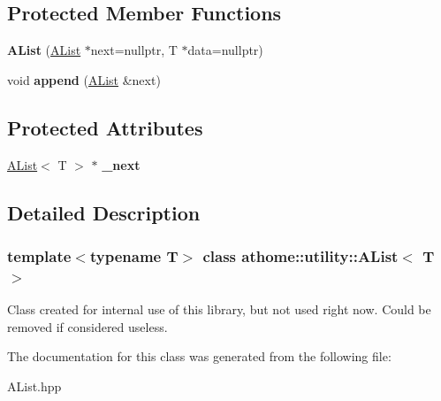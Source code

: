 \subsection*{Protected Member Functions}
\begin{DoxyCompactItemize}
\item 
\mbox{\label{classathome_1_1utility_1_1_a_list_a98364a62d1b0d749b5424ae79664a3b5}} 
{\bfseries A\+List} (\mbox{\hyperlink{classathome_1_1utility_1_1_a_list}{A\+List}} $\ast$next=nullptr, T $\ast$data=nullptr)
\item 
\mbox{\label{classathome_1_1utility_1_1_a_list_ac6e76d2797794b801d83e20768045c50}} 
void {\bfseries append} (\mbox{\hyperlink{classathome_1_1utility_1_1_a_list}{A\+List}} \&next)
\end{DoxyCompactItemize}
\subsection*{Protected Attributes}
\begin{DoxyCompactItemize}
\item 
\mbox{\label{classathome_1_1utility_1_1_a_list_ac609614ff3ba7f59cc083451e4d0ee0f}} 
\mbox{\hyperlink{classathome_1_1utility_1_1_a_list}{A\+List}}$<$ T $>$ $\ast$ {\bfseries \+\_\+next}
\end{DoxyCompactItemize}


\subsection{Detailed Description}
\subsubsection*{template$<$typename T$>$\newline
class athome\+::utility\+::\+A\+List$<$ T $>$}

Class created for internal use of this library, but not used right now. Could be removed if considered useless. 

The documentation for this class was generated from the following file\+:\begin{DoxyCompactItemize}
\item 
A\+List.\+hpp\end{DoxyCompactItemize}
